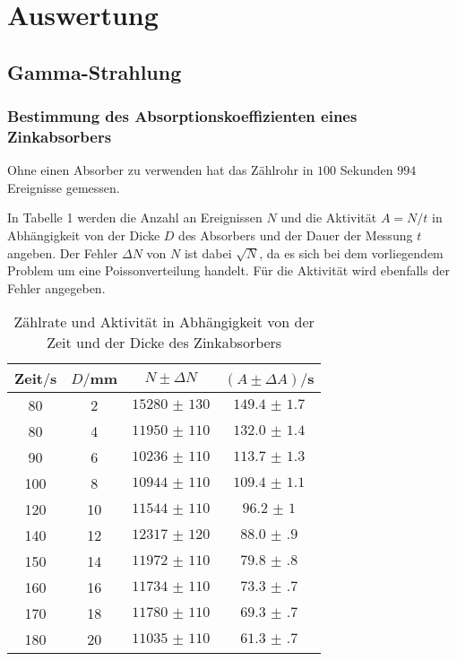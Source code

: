 \section{Auswertung}
\label{sec:Auswertung}

\subsection{Gamma-Strahlung}
\subsubsection{Bestimmung des Absorptionskoeffizienten eines Zinkabsorbers}
Ohne einen Absorber zu verwenden hat das Zählrohr in $100$ Sekunden $994$ Ereignisse gemessen.

In Tabelle 1 werden die Anzahl an Ereignissen $N$ und die Aktivität $A = N/t$ in Abhängigkeit von der Dicke $D$ des Absorbers und der
Dauer der Messung $t$ angeben. Der Fehler $\Delta N$ von $N$ ist dabei $\sqrt{N}$, da es sich bei dem vorliegendem Problem um eine
Poissonverteilung handelt. Für die Aktivität wird ebenfalls der Fehler angegeben.

\begin{table}[H]
  \centering
  \caption{Zählrate und Aktivität in Abhängigkeit von der Zeit und der Dicke des Zinkabsorbers}
  \label{tab:Rechteckspannung}
  \begin{tabular}{c c c c}
    \toprule
    Zeit$/$s & $D/$mm & $N \pm \Delta N$ & $(A \pm \Delta A)/$s\\
    \midrule
    80 & 2 & $\num{15280(130)}$  &  $\num{149.4(17)}$ \\
    80 & 4 & $\num{11950(110)}$ &   $\num{132.0(14)}$ \\
    90 & 6 & $\num{10236(110)}$ &   $\num{113.7(13)}$ \\
    100 & 8 & $\num{10944(110)}$ &  $\num{109.4(11)}$ \\
    120 & 10 & $\num{11544(110)}$ & $\num{96.2(10)}$ \\
    140 & 12 & $\num{12317(120)}$ & $\num{88.0(9)}$ \\
    150 & 14 & $\num{11972(110)}$ & $\num{79.8(8)}$ \\
    160 & 16 & $\num{11734(110)}$ & $\num{73.3(7)}$ \\
    170 & 18 & $\num{11780(110)}$ & $\num{69.3(7)}$ \\
    180 & 20 & $\num{11035(110)}$ & $\num{61.3(7)}$ \\
    \bottomrule
  \end{tabular}
\end{table}

